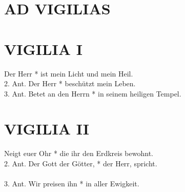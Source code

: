 \thispagestyle{plain}



\section[VIGILIAE]{AD VIGILIAS}


\def\greinitialformat#1{{\fontsize{40}{40}\selectfont #1}}
\setaboveinitialseparation{0.72mm}


\medskip

\begin{sloppypar}
{}
\end{sloppypar}

\bigskip



\section{VIGILIA I}

\begin{sloppypar}

{ Der Herr * ist mein Licht und mein Heil. \\
2. Ant. Der Herr * beschützt mein Leben. \\
3. Ant. Betet an den Herrn * in seinem heiligen Tempel. \\}
\end{sloppypar}

\begin{flushleft}


\end{flushleft}


\section{VIGILIA II}

\begin{sloppypar}
{ Neigt euer Ohr * die ihr den Erdkreis bewohnt\-. \\
2. Ant. Der Gott der Götter, * der Herr, spricht.\\ \\
3. Ant. Wir preisen ihn * in aller Ewigkeit. }
\end{sloppypar}

